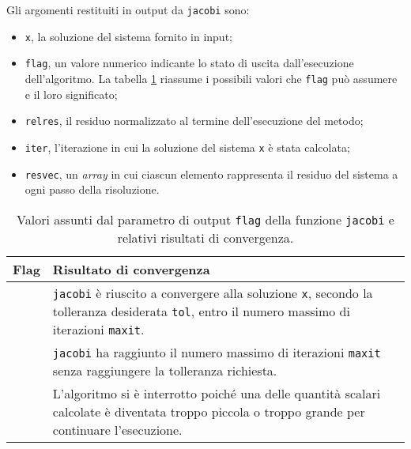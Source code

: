 Gli argomenti restituiti in output da \lstinline{jacobi} sono:
\begin{itemize}
    \item \lstinline{x}, la soluzione del sistema fornito in input;
    \item \lstinline{flag}, un valore numerico indicante lo stato di uscita dall'esecuzione dell'algoritmo. La tabella \ref{tab:flagJacobi} riassume i possibili valori che \lstinline{flag} pu\`o assumere e il loro significato;
    \item \lstinline{relres}, il residuo normalizzato al termine dell'esecuzione del metodo;
    \item \lstinline{iter}, l'iterazione in cui la soluzione del sistema \lstinline{x} \`e stata calcolata;
    \item \lstinline{resvec}, un \textit{array} in cui ciascun elemento rappresenta il residuo del sistema a ogni passo della risoluzione.
\end{itemize}
\begin{table}[htbp]
    \renewcommand{\arraystretch}{1.2}
    \centering
    \begin{tabularx}{\textwidth}{@{} >{\centering\arraybackslash}m{1.5cm} X @{}}
        \toprule
        Flag & Risultato di convergenza                                                                                                                                                            \\
        \midrule
        0    & \lstinline{jacobi} è riuscito a convergere alla soluzione \lstinline{x}, secondo la tolleranza desiderata \lstinline{tol}, entro il numero massimo di iterazioni \lstinline{maxit}. \\
        \addlinespace
        1    & \lstinline{jacobi} ha raggiunto il numero massimo di iterazioni \lstinline{maxit} senza raggiungere la tolleranza richiesta.                                                        \\
        \addlinespace
        2    & L'algoritmo si è interrotto poiché una delle quantità scalari calcolate è diventata troppo piccola o troppo grande per continuare l'esecuzione.                                     \\
        \bottomrule
    \end{tabularx}
    \caption{Valori assunti dal parametro di output \lstinline{flag} della funzione \lstinline{jacobi} e relativi risultati di convergenza.}
    \label{tab:flagJacobi}
\end{table}
